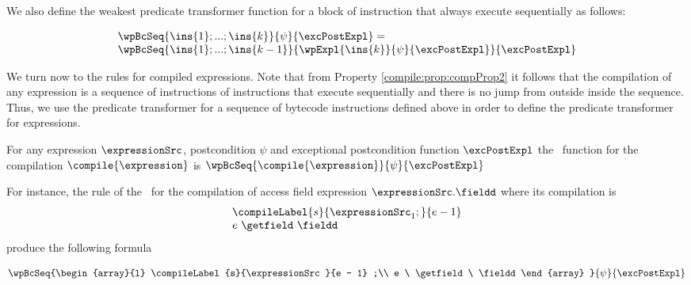 We also define the weakest predicate transformer function  for a block of instruction that always execute sequentially as follows:

\begin{wpSeq}\label{pog:wpBc:wpSeq}
     $$ \begin{array}{l} 
              \wpBcSeq{ \ins{1};...;\ins{k}}{ \psi  } { \excPostExpl } =\\
              \wpBcSeq{\ins{1};...;\ins{k -1} }{ \wpExpl{ \ins{k} }{ \psi }{ \excPostExpl} }{\excPostExpl} 
        \end{array}$$ 

\end{wpSeq}



We turn now to the rules for compiled expressions. Note that from Property \ref{compile:prop:compProp2} it follows that 
the compilation of any expression is a sequence of instructions of instructions that execute sequentially and there is no jump from outside inside 
the sequence. Thus, we use 
the predicate transformer  for a sequence of bytecode instructions defined above in order to define 
the predicate transformer for  expressions. 

\begin{wpExpr} \label{wpExpr}
               For any expression $\expressionSrc$, postcondition $\psi$ and exceptional postcondition function
               $\excPostExpl$ the \wpName \ function for the compilation $\compile{\expression}$  is
               $ \wpBcSeq{\compile{\expression} }{ \psi  } { \excPostExpl }  $
 \end{wpExpr}

For instance, the  rule of the \wpName  \ for the compilation of access  field expression $\expressionSrc.\fieldd $ 
where its compilation is 
$$\begin{array}{l}
    \compileLabel{s}{ \expressionSrc_1;}{e - 1}\\
     e \ \getfield \ \fieldd \\
 \end{array}
$$
  produce the following formula 
 
$$  \wpBcSeq{\begin{array}{l}
	              \compileLabel{s}{\expressionSrc }{e - 1} ;\\
	              e \ \getfield \ \fieldd 
	           \end{array} }{ \psi  } { \excPostExpl } $$	

